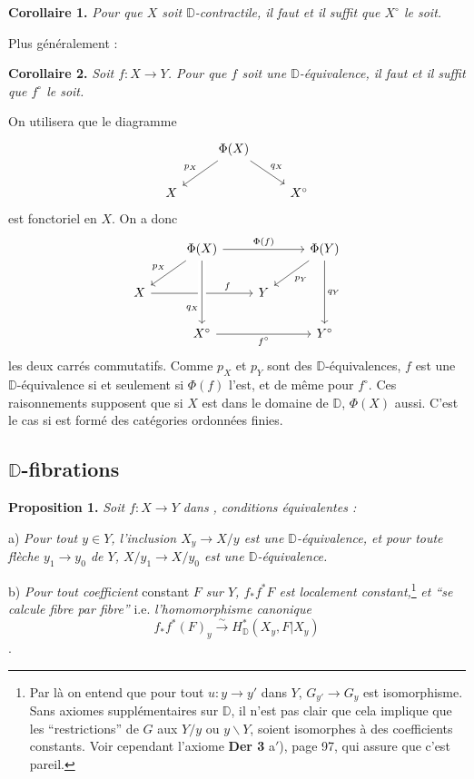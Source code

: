 \documentclass[11pt,leqno]{article}
\newcommand{\printedpage}[1]{\marginpar{\footnotesize p.~#1}}
\newcommand{\msp}[1]{\marginpar{\footnotesize [#1]}}
\newcommand{\Dia}{\mathsf{Dia}}
\newcommand{\D}{\mathbb{D}}
\newcommand{\bs}{\backslash}
\begin{document}
\textbf{Corollaire 1.} \textit{Pour que $X$ soit $\D$-contractile, il faut et il suffit que $X^\circ$ le soit.}

\hspace*{\parindent}Plus généralement :

\textbf{Corollaire 2.} \textit{Soit $f : X \to Y$. Pour que $f$ soit une $\D$-équivalence, il faut et il suffit que $f^\circ$ le soit.}

\hspace*{\parindent}On utilisera que le diagramme
\[
\begin{tikzcd}
& \Phi(X) \arrow[dl, "p_X"'] \arrow[dr, "q_X"] & \\
X & & X^\circ
\end{tikzcd}
\]
est fonctoriel en $X$. On a donc
\[
\begin{tikzcd}
& \Phi(X) \arrow[rr, "\Phi(f)"] \arrow[dl, "p_X"'] & & \Phi(Y) \arrow[dl, "p_Y"] \arrow[dd, "q_Y"] \\
X \arrow[rr, "f" near end] \arrow[from=1-2, to=3-2, "q_X"' near end, crossing over] & & Y & \\
& X^\circ \arrow[rr, "f^\circ"'] & & Y^\circ
\end{tikzcd}
\]
les deux carrés commutatifs. Comme $p_X$ et $p_Y$ sont des $\D$-équivalences, $f$ est une $\D$-équivalence si et seulement si $\Phi(f)$ l'est, et de même pour $f^\circ$. Ces raisonnements supposent que si $X$ est dans le domaine de $\D$, $\Phi(X)$ aussi. C'est le cas si \Dia{} est formé des catégories ordonnées finies.

\printedpage{46}
\msp{page 76}

\subsection*{$\D$-fibrations}

\textbf{Proposition 1.} \textit{Soit $f : X \to Y$ dans} \Dia\textit{, conditions équivalentes :}

\hspace*{\parindent}a) \textit{Pour tout $y \in Y$, l'inclusion $X_y \to X/y$ est une $\D$-équivalence, et pour toute flèche $y_1 \to y_0$ de $Y$, $X/y_1 \to X/y_0$ est une $\D$-équivalence.}

\hspace*{\parindent}b) \textit{Pour tout coefficient} constant \textit{$F$ sur $Y$, $f_*f^*F$ est localement constant,}\footnote[33]{Par là on entend que pour tout $u : y \to y'$ dans $Y$, $G_{y'} \to G_y$ est isomorphisme. Sans axiomes supplémentaires sur $\D$, il n'est pas clair que cela implique que les ``restrictions'' de $G$ aux $Y/y$ ou $y\bs Y$, soient isomorphes à des coefficients constants. Voir cependant l'axiome \textbf{Der 3} a$'$), page 97, qui assure que c'est pareil.} \textit{et ``se calcule fibre par fibre''} i.e. \textit{l'homomorphisme canonique}
\[
f_*f^*(F)_y \overset{\sim}{\longrightarrow} H^*_{\D}(X_y, F|X_y)
\]
.
\end{document}
